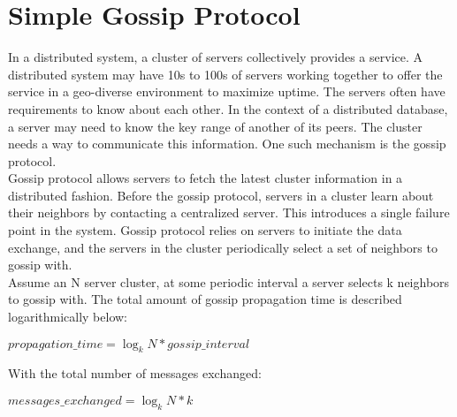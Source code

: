 % 

\chapter{Simple Gossip Protocol}

In a distributed system, a cluster of servers collectively provides a service. A
distributed system may have 10s to 100s of servers working together to offer the
service in a geo-diverse environment to maximize uptime. The servers often
have requirements to know about each other. In the context of a distributed
database, a server may need to know the key range of another of its peers. The
cluster needs a way to communicate this information. One such mechanism is the
gossip protocol.\\

Gossip protocol allows servers to fetch the latest cluster information in a
distributed fashion. Before the gossip protocol, servers in a cluster learn about
their neighbors by contacting a centralized server. This introduces a single
failure point in the system. Gossip protocol relies on servers to initiate
the data exchange, and the servers in the cluster periodically select a set of
neighbors to gossip with.\\

Assume an N server cluster, at some periodic interval a server selects k neighbors
to gossip with. The total amount of gossip propagation time is described
logarithmically below:

\begin{center}
$propagation\_time = \log_k N * gossip\_interval$
\end{center}

With the total number of messages exchanged:
\begin{center}
$messages\_exchanged = \log_k N * k$
\end{center}

